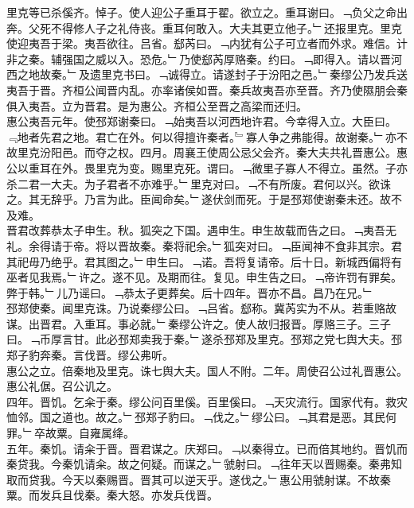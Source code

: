\documentclass{zhvt-classic}
\begin{document}
\hspace*{2em}里克等已杀傒齐。悼子。使人迎公子重耳于翟。欲立之。重耳谢曰。﹁负父之命出奔。父死不得修人子之礼侍丧。重耳何敢入。大夫其更立他子。﹂还报里克。里克使迎夷吾于梁。夷吾欲往。吕省。郄芮曰。﹁内犹有公子可立者而外求。难信。计非之秦。辅强国之威以入。恐危。﹂乃使郄芮厚赂秦。约曰。﹁即得入。请以晋河西之地故秦。﹂及遗里克书曰。﹁诚得立。请遂封子于汾阳之邑。﹂秦缪公乃发兵送夷吾于晋。齐桓公闻晋内乱。亦率诸侯如晋。秦兵故夷吾亦至晋。齐乃使隰朋会秦俱入夷吾。立为晋君。是为惠公。齐桓公至晋之高梁而还归。\\
\hspace*{2em}惠公夷吾元年。使邳郑谢秦曰。﹁始夷吾以河西地许君。今幸得入立。大臣曰。﹃地者先君之地。君亡在外。何以得擅许秦者。﹄寡人争之弗能得。故谢秦。﹂亦不故里克汾阳邑。而夺之权。四月。周襄王使周公忌父会齐。秦大夫共礼晋惠公。惠公以重耳在外。畏里克为变。赐里克死。谓曰。﹁微里子寡人不得立。虽然。子亦杀二君一大夫。为子君者不亦难乎。﹂里克对曰。﹁不有所废。君何以兴。欲诛之。其无辞乎。乃言为此。臣闻命矣。﹂遂伏剑而死。于是邳郑使谢秦未还。故不及难。\\
\hspace*{2em}晋君改葬恭太子申生。秋。狐突之下国。遇申生。申生故载而告之曰。﹁夷吾无礼。余得请于帝。将以晋故秦。秦将祀余。﹂狐突对曰。﹁臣闻神不食非其宗。君其祀毋乃绝乎。君其图之。﹂申生曰。﹁诺。吾将复请帝。后十日。新城西偏将有巫者见我焉。﹂许之。遂不见。及期而往。复见。申生告之曰。﹁帝许罚有罪矣。弊于韩。﹂儿乃谣曰。﹁恭太子更葬矣。后十四年。晋亦不昌。昌乃在兄。﹂\\
\hspace*{2em}邳郑使秦。闻里克诛。乃说秦缪公曰。﹁吕省。郄称。冀芮实为不从。若重赂故谋。出晋君。入重耳。事必就。﹂秦缪公许之。使人故归报晋。厚赂三子。三子曰。﹁币厚言甘。此必邳郑卖我于秦。﹂遂杀邳郑及里克。邳郑之党七舆大夫。邳郑子豹奔秦。言伐晋。缪公弗听。\\
\hspace*{2em}惠公之立。倍秦地及里克。诛七舆大夫。国人不附。二年。周使召公过礼晋惠公。惠公礼倨。召公讥之。\\
\hspace*{2em}四年。晋饥。乞籴于秦。缪公问百里傒。百里傒曰。﹁天灾流行。国家代有。救灾恤邻。国之道也。故之。﹂邳郑子豹曰。﹁伐之。﹂缪公曰。﹁其君是恶。其民何罪。﹂卒故粟。自雍属绛。\\
\hspace*{2em}五年。秦饥。请籴于晋。晋君谋之。庆郑曰。﹁以秦得立。已而倍其地约。晋饥而秦贷我。今秦饥请籴。故之何疑。而谋之。﹂虢射曰。﹁往年天以晋赐秦。秦弗知取而贷我。今天以秦赐晋。晋其可以逆天乎。遂伐之。﹂惠公用虢射谋。不故秦粟。而发兵且伐秦。秦大怒。亦发兵伐晋。\\
\end{document}
